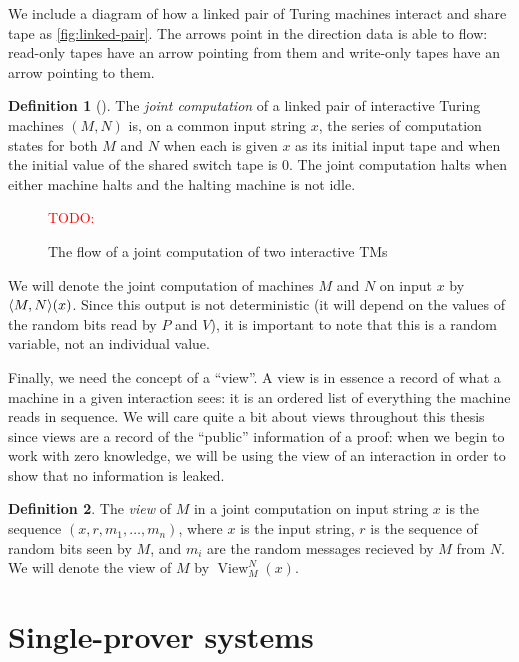 \documentclass[english,12pt]{reedthesis}
\theoremstyle{plain}
\theoremstyle{definition}
\newtheorem{defn}[defn]{Definition}
\theoremstyle{remark}
\DeclareMathOperator{\View}{View}
\DeclarePairedDelimiter{\ang}{\langle}{\rangle}
\newcommand{\TODO}[1]{\textcolor{red}{TODO: #1}}
\begin{document}
We include a diagram of how a linked pair of Turing machines interact and share
tape as \cref{fig:linked-pair}. The arrows point in the direction data is able
to flow: read-only tapes have an arrow pointing from them and write-only tapes
have an arrow pointing to them.

\begin{defn}[{\cite[Def.\ 4.2.2]{Go01}}]\label{def:joint-comp}
  The \emph{joint computation} of a linked pair of interactive Turing machines
  $(M, N)$ is, on a common input string $x$, the series of computation states
  for both $M$ and $N$ when each is given $x$ as its initial input tape and when
  the initial value of the shared switch tape is $0$. The joint computation
  halts when either machine halts and the halting machine is not idle.
\end{defn}

\begin{figure}
  \TODO{}
  \caption{The flow of a joint computation of two interactive
    TMs}\label{fig:joint-comp-flow}
\end{figure}

We will denote the joint computation of machines $M$ and $N$ on input $x$ by
$\ang{M, N}(x)$. Since this output is not deterministic (it will depend on the
values of the random bits read by $P$ and $V$), it is important to note that
this is a random variable, not an individual value.

Finally, we need the concept of a ``view''. A view is in essence a record of
what a machine in a given interaction sees: it is an ordered list of everything
the machine reads in sequence. We will care quite a bit about views throughout
this thesis since views are a record of the ``public'' information of a proof:
when we begin to work with zero knowledge, we will be using the view of an
interaction in order to show that no information is leaked.

\begin{defn}\label{def:view}
  The \emph{view} of $M$ in a joint computation on input string $x$ is the
  sequence $(x, r, m_{1}, \ldots, m_{n})$, where $x$ is the input string, $r$ is the
  sequence of random bits seen by $M$, and $m_{i}$ are the random messages
  recieved by $M$ from $N$. We will denote the view of $M$ by
  $\View_{M}^{N}(x)$.
\end{defn}

\section{Single-prover systems}\label{sec:single-prover}
\end{document}
